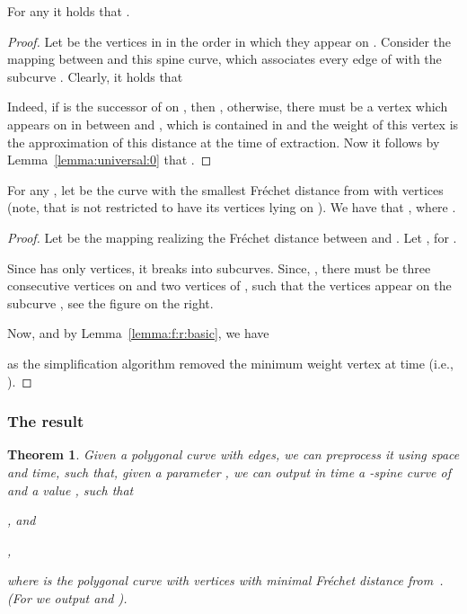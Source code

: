 \documentclass[12pt]{article}
\newtheorem{theorem}{Theorem}[section]
\newcommand{\thmlab}[1]{{\label{theo:#1}}}
\newcommand{\lemlab}[1]{\label{lemma:#1}}
\newcommand{\lemref}[1]{Lemma~\ref{lemma:#1}}
\newcommand{\Frechet}{Fr\'{e}c{h}e{}t\xspace}\providecommand{\Arr}{\mathop{\mathrm{\EuScript{A}}}}
\numberwithin{figure}{section}
\numberwithin{equation}{section}
\newcommand{\postdecessor}{successor\xspace}
\begin{document}
\begin{lemma}\lemlab{universal:i}For any  it holds that .
\end{lemma}
\begin{proof}
    Let  be the vertices in  in
    the order in which they appear on .
    Consider the mapping between  and this spine curve, which
    associates every edge  of
     with the subcurve
    . Clearly, it holds that
    
    Indeed, if  is the \postdecessor of  on
    , then
    , otherwise, there must be a vertex which
    appears on  in between  and , which is
    contained in  and the weight of
    this vertex is the approximation of this distance at the time of
    extraction.  Now it follows by \lemref{universal:0} that
    .
\end{proof}


\begin{lemma}\lemlab{universal:ii}For any , let  be the curve with the
    smallest \Frechet distance from  with  vertices (note,
    that  is not restricted to have its vertices lying on
    ). We have that , where .
\end{lemma}
\begin{proof}
    Let  be the mapping realizing the \Frechet
    distance between  and . Let , for .
    
    
    Since  has only  vertices, it breaks  into 
    subcurves. Since, , there must be three
    consecutive vertices  on
     and two vertices 
    of , such that the vertices  appear on the subcurve , see the figure on the
    right.
    
    Now,  and by \lemref{f:r:basic}, we have
    
    as the simplification algorithm removed the minimum weight vertex
    at time  (i.e., ).
\end{proof}

\subsubsection{The result}

\begin{theorem}
    \thmlab{f:r:simpl:result}Given a polygonal curve  with  edges, we can preprocess it
    using  space and  time, such that, given
    a parameter , we can output in  time a
    -spine curve  of  and a value
    , such that \smallskip
    \begin{compactenum}[\quad(i)]
        \item ,
and \smallskip
        \item ,
    \end{compactenum}
    \smallskip where  is the polygonal curve with  vertices with minimal
    \Frechet distance from~.  (For  we output 
    and ).
\end{theorem}
\end{document}
